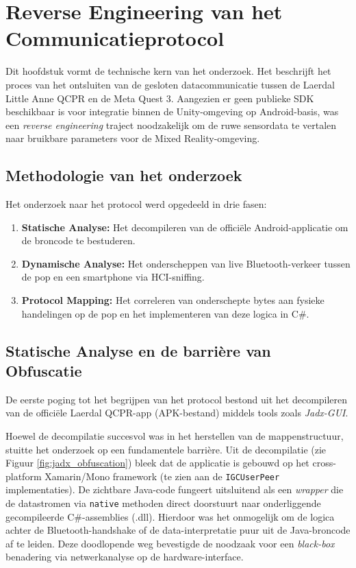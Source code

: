 \chapter{Reverse Engineering van het Communicatieprotocol}
\label{ch:reverse_engineering}

Dit hoofdstuk vormt de technische kern van het onderzoek. Het beschrijft het proces van het ontsluiten van de gesloten datacommunicatie tussen de 
Laerdal Little Anne QCPR en de Meta Quest 3. Aangezien er geen publieke SDK beschikbaar is voor integratie binnen de Unity-omgeving op Android-basis, 
was een \textit{reverse engineering} traject noodzakelijk om de ruwe sensordata te vertalen naar bruikbare parameters voor de Mixed Reality-omgeving.

\section{Methodologie van het onderzoek}
Het onderzoek naar het protocol werd opgedeeld in drie fasen:
\begin{enumerate}
    \item \textbf{Statische Analyse:} Het decompileren van de officiële Android-applicatie om de broncode te bestuderen.
    \item \textbf{Dynamische Analyse:} Het onderscheppen van live Bluetooth-verkeer tussen de pop en een smartphone via HCI-sniffing.
    \item \textbf{Protocol Mapping:} Het correleren van onderschepte bytes aan fysieke handelingen op de pop en het implementeren van deze logica in C\#.
\end{enumerate}

\section{Statische Analyse en de barrière van Obfuscatie}
De eerste poging tot het begrijpen van het protocol bestond uit het decompileren van de officiële Laerdal QCPR-app (APK-bestand) middels tools zoals \textit{Jadx-GUI}. 

Hoewel de decompilatie succesvol was in het herstellen van de mappenstructuur, stuitte het onderzoek op een fundamentele barrière. 
Uit de decompilatie (zie Figuur \ref{fig:jadx_obfuscation}) bleek dat de applicatie is gebouwd op het cross-platform Xamarin/Mono framework (te zien aan de \texttt{IGCUserPeer} implementaties). De zichtbare Java-code fungeert uitsluitend als een \textit{wrapper} die de datastromen via \texttt{native} methoden direct doorstuurt naar onderliggende gecompileerde C\#-assemblies (.dll).
Hierdoor was het onmogelijk om de logica achter de Bluetooth-handshake of de data-interpretatie puur uit de Java-broncode af te leiden. 
Deze doodlopende weg bevestigde de noodzaak voor een \textit{black-box} benadering via netwerkanalyse op de hardware-interface.

